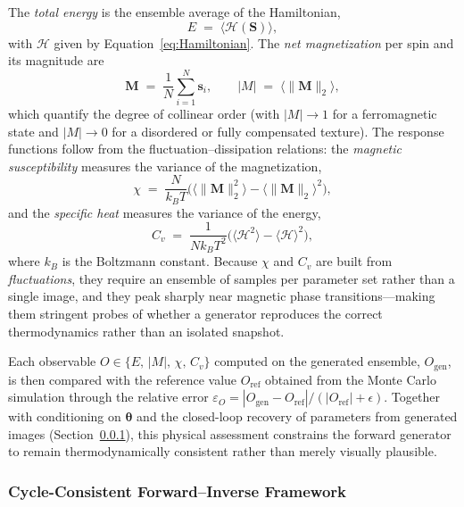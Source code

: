 \documentclass[letterpaper, 12, one column]{article}
\begin{document}
The \emph{total energy} is the ensemble average of the Hamiltonian,
\begin{equation}\label{eq:obs_energy}
E \;=\; \big\langle \mathcal{H}(\mathbf{S}) \big\rangle ,
\end{equation}
with $\mathcal{H}$ given by Equation~\ref{eq:Hamiltonian}. The \emph{net magnetization} per spin and its magnitude are
\begin{equation}\label{eq:obs_mag}
\mathbf{M} \;=\; \frac{1}{N}\sum_{i=1}^{N}\mathbf{s}_i ,
\qquad
|M| \;=\; \big\langle \lVert \mathbf{M} \rVert_2 \big\rangle ,
\end{equation}
which quantify the degree of collinear order (with $|M|\!\to\!1$ for a ferromagnetic state and $|M|\!\to\!0$ for a disordered or fully compensated texture). The response functions follow from the fluctuation--dissipation relations: the \emph{magnetic susceptibility} measures the variance of the magnetization,
\begin{equation}\label{eq:obs_chi}
\chi \;=\; \frac{N}{k_B T}\Big( \big\langle \lVert\mathbf{M}\rVert_2^{2} \big\rangle - \big\langle \lVert\mathbf{M}\rVert_2 \big\rangle^{2} \Big),
\end{equation}
and the \emph{specific heat} measures the variance of the energy,
\begin{equation}\label{eq:obs_cv}
C_v \;=\; \frac{1}{N k_B T^{2}}\Big( \big\langle \mathcal{H}^{2} \big\rangle - \big\langle \mathcal{H} \big\rangle^{2} \Big),
\end{equation}
where $k_B$ is the Boltzmann constant. Because $\chi$ and $C_v$ are built from \emph{fluctuations}, they require an ensemble of samples per parameter set rather than a single image, and they peak sharply near magnetic phase transitions---making them stringent probes of whether a generator reproduces the correct thermodynamics rather than an isolated snapshot.

Each observable $O\in\{E,\,|M|,\,\chi,\,C_v\}$ computed on the generated ensemble, $O_{\mathrm{gen}}$, is then compared with the reference value $O_{\mathrm{ref}}$ obtained from the Monte Carlo simulation through the relative error $\varepsilon_O = |O_{\mathrm{gen}}-O_{\mathrm{ref}}|/(|O_{\mathrm{ref}}|+\epsilon)$. Together with conditioning on $\boldsymbol{\theta}$ and the closed-loop recovery of parameters from generated images (Section~\ref{sec:cycle_consistency}), this physical assessment constrains the forward generator to remain thermodynamically consistent rather than merely visually plausible.

\subsubsection{Cycle-Consistent Forward--Inverse Framework}\label{sec:cycle_consistency}
\end{document}
